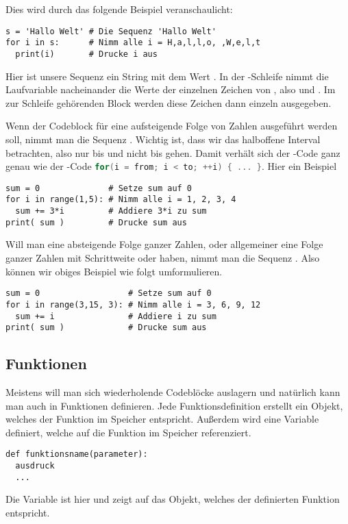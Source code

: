 Dies wird durch das folgende Beispiel veranschaulicht:
\begin{lstlisting}
s = 'Hallo Welt' # Die Sequenz 'Hallo Welt'
for i in s:      # Nimm alle i = H,a,l,l,o, ,W,e,l,t
  print(i)       # Drucke i aus
\end{lstlisting}
Hier ist unsere Sequenz  ein String mit dem Wert . In der -Schleife nimmt die Laufvariable nacheinander
die Werte der einzelnen Zeichen von , also   und . Im zur Schleife gehörenden Block werden 
diese Zeichen dann einzeln ausgegeben.

Wenn der Codeblock für eine aufsteigende Folge von Zahlen  ausgeführt werden soll, nimmt man die Sequenz .
Wichtig ist, dass wir das halboffene Interval betrachten, also nur bis  und nicht bis  gehen.
Damit verhält sich der \Python-Code  ganz genau wie der \CC-Code \lstinline[language=C++,style=CPPinline]|for(i = from; i < to; ++i) { ... }|.
Hier ein Beispiel
\begin{lstlisting}
sum = 0              # Setze sum auf 0
for i in range(1,5): # Nimm alle i = 1, 2, 3, 4
  sum += 3*i         # Addiere 3*i zu sum
print( sum )         # Drucke sum aus
\end{lstlisting}

Will man eine absteigende Folge ganzer Zahlen, oder allgemeiner eine Folge ganzer Zahlen mit Schrittweite  oder  haben,
nimmt man die Sequenz .
Also können wir obiges Beispiel wie folgt umformulieren.
\begin{lstlisting}
sum = 0                  # Setze sum auf 0
for i in range(3,15, 3): # Nimm alle i = 3, 6, 9, 12
  sum += i               # Addiere i zu sum
print( sum )             # Drucke sum aus
\end{lstlisting}


\subsection{Funktionen}
\label{section:crashkurs:funktionen}
Meistens will man sich wiederholende Codeblöcke auslagern und natürlich kann man auch in \Python Funktionen definieren.
Jede Funktionsdefinition erstellt ein Objekt, welches der Funktion im Speicher entspricht.
Außerdem wird eine Variable definiert, welche auf die Funktion im Speicher referenziert.
\begin{lstlisting}
def funktionsname(parameter):
  ausdruck
  ...
\end{lstlisting}
Die Variable ist hier  und zeigt auf das Objekt, welches der definierten Funktion entspricht.

